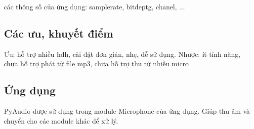 các thông số của ứng dụng: samplerate, bitdeptg, chanel, ...
\subsection{Các ưu, khuyết điểm}
Ưu: hỗ trợ nhiều hđh, cài đặt đơn giản, nhẹ, dễ sử dụng.
Nhược: ít tính năng, chưa hỗ trợ phát từ file mp3, chưa hỗ trợ thu từ nhiều micro
\subsection{Ứng dụng}
PyAudio được sử dụng trong module Microphone của ứng dụng. Giúp thu âm và chuyển cho các module khác để xử lý.





